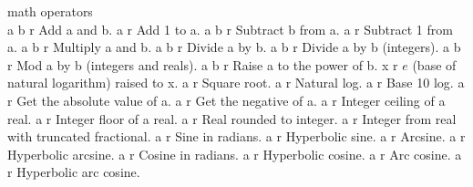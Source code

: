 \begin{longtable}{}
{math operators} \\
\hline \hline
\optableent
	{a b}
	{{\bf {}}}
	{r}
	{Add a and b.}
\hline
\optableent
	{a}
	{{\bf {}}}
	{r}
	{Add 1 to a.}
\hline
\optableent
	{a b}
	{{\bf {}}}
	{r}
	{Subtract b from a.}
\hline
\optableent
	{a}
	{{\bf {}}}
	{r}
	{Subtract 1 from a.}
\hline
\optableent
	{a b}
	{{\bf {}}}
	{r}
	{Multiply a and b.}
\hline
\optableent
	{a b}
	{{\bf {}}}
	{r}
	{Divide a by b.}
\hline
\optableent
	{a b}
	{{\bf {}}}
	{r}
	{Divide a by b (integers).}
\hline
\optableent
	{a b}
	{{\bf {}}}
	{r}
	{Mod a by b (integers and reals).}
\hline
\optableent
	{a b}
	{{\bf {}}}
	{r}
	{Raise a to the power of b.}
\hline
\optableent
	{x}
	{{\bf {}}}
	{r}
	{$e$ (base of natural logarithm) raised to x.}
\hline
\optableent
	{a}
	{{\bf {}}}
	{r}
	{Square root.}
\hline
\optableent
	{a}
	{{\bf {}}}
	{r}
	{Natural log.}
\hline
\optableent
	{a}
	{{\bf {}}}
	{r}
	{Base 10 log.}
\hline
\optableent
	{a}
	{{\bf {}}}
	{r}
	{Get the absolute value of a.}
\hline
\optableent
	{a}
	{{\bf {}}}
	{r}
	{Get the negative of a.}
\hline
\optableent
	{a}
	{{\bf {}}}
	{r}
	{Integer ceiling of a real.}
\hline
\optableent
	{a}
	{{\bf {}}}
	{r}
	{Integer floor of a real.}
\hline
\optableent
	{a}
	{{\bf {}}}
	{r}
	{Real rounded to integer.}
\hline
\optableent
	{a}
	{{\bf {}}}
	{r}
	{Integer from real with truncated fractional.}
\hline
\optableent
	{a}
	{{\bf {}}}
	{r}
	{Sine in radians.}
\hline
\optableent
	{a}
	{{\bf {}}}
	{r}
	{Hyperbolic sine.}
\hline
\optableent
	{a}
	{{\bf {}}}
	{r}
	{Arcsine.}
\hline
\optableent
	{a}
	{{\bf {}}}
	{r}
	{Hyperbolic arcsine.}
\hline
\optableent
	{a}
	{{\bf {}}}
	{r}
	{Cosine in radians.}
\hline
\optableent
	{a}
	{{\bf {}}}
	{r}
	{Hyperbolic cosine.}
\hline
\optableent
	{a}
	{{\bf {}}}
	{r}
	{Arc cosine.}
\hline
\optableent
	{a}
	{{\bf {}}}
	{r}
	{Hyperbolic arc cosine.}

\end{longtable}
